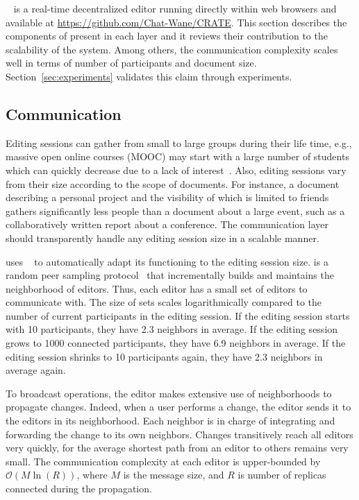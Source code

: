 \CRATE~\cite{nedelec2016crate} is a real-time decentralized editor running
directly within web browsers and available at
\url{https://github.com/Chat-Wane/CRATE}. 
This section describes the components of \CRATE present in each layer and it
reviews their contribution to the scalability of the system. Among others, the
communication complexity scales well in terms of number of participants and
document size. Section~\ref{sec:experiments} validates this claim through
experiments.


\subsection{Communication}
\label{subsec:communication}

Editing sessions can gather from small to large groups during their life time,
e.g., massive open online courses (MOOC) may start with a large number of
students which can quickly decrease due to a lack of
interest~\cite{breslow2013studying}. Also, editing sessions vary from their size
according to the scope of documents. For instance, a document describing a
personal project and the visibility of which is limited to friends gathers
significantly less people than a document about a large event, such as a
collaboratively written report about a conference. The communication layer
should transparently handle any editing session size in a scalable manner.


\CRATE uses \SPRAY~\cite{nedelec2015spray} to automatically adapt its
functioning to the editing session size. \SPRAY is a random peer sampling
protocol~\cite{jelasity2007gossip} that incrementally builds and maintains the
neighborhood of editors. Thus, each editor has a small set of editors to
communicate with. The size of sets scales logarithmically compared to the number
of current participants in the editing session. If the editing session starts
with 10 participants, they have 2.3 neighbors in average. If the editing session
grows to 1000 connected participants, they have 6.9 neighbors in average. If the
editing session shrinks to 10 participants again, they have 2.3 neighbors in
average again.

To broadcast operations, the editor makes extensive use of neighborhoods to
propagate changes. Indeed, when a user performs a change, the editor sends it to
the editors in its neighborhood. Each neighbor is in charge of integrating and
forwarding the change to its own neighbors. Changes transitively reach all
editors very quickly, for the average shortest path from an editor to others
remains very small. The communication complexity at each editor is upper-bounded
by $\mathcal{O}(M \ln(R))$, where $M$ is the message size, and $R$ is number of
replicas connected during the propagation.

